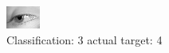 \begin{figure}[h!]
\begin{center}
\includegraphics[width=0.60\columnwidth]{figures/ID2978_class_3_target_4.png}
\end{center}
\caption{ Classification: 3 actual target: 4}
\label{fig:ID2978_class_3_target_4}
\end{figure}
